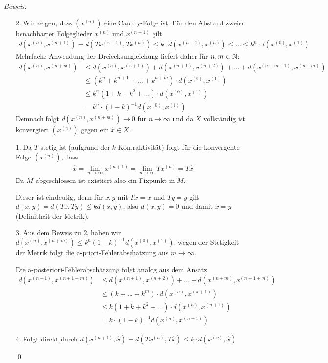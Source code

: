 \textit{Beweis.} 
\begin{enumerate}
  \item[2.] 
  Wir zeigen, dass $(x^{(n)})$ eine Cauchy-Folge ist: Für den Abstand zweier benachbarter Folgeglieder $x^{(n)}$ 
  und $x^{(n+1)}$ gilt
  \begin{align*}
    d(x^{(n)},x^{(n+1)}) 
    = d(Tx^{(n-1)},Tx^{(n)}) 
    \leq k\cdot d(x^{(n-1)},x^{(n)}) 
    \leq 
    \dotsc 
    \leq k^n\cdot d(x^{(0)},x^{(1)})
  \end{align*}
  Mehrfache Anwendung der Dreiecksungleichung liefert daher für $n,m\in\mathbb N$:
  \begin{align*}
    d(x^{(n)},x^{(n+m)}) 
    &\leq d(x^{(n)},x^{(n+1)}) + d(x^{(n+1)},x^{(n+2)}) + \dotsc + d(x^{(n+m-1)}, x^{(n+m)}) \\
    & \leq (k^n + k^{n+1} + \dotsc + k^{n+m})\cdot d(x^{(0)},x^{(1)}) \\
    & \leq k^n(1+k+k^2+\dotsc)\cdot d(x^{(0)},x^{(1)}) \\
    & = k^n\cdot(1-k)^{-1}d(x^{(0)},x^{(1)})
  \end{align*}
  Demnach folgt $d(x^{(n)},x^{(n+m)})\rightarrow 0$ für $n\rightarrow \infty$ und da $X$ vollständig ist 
  konvergiert $(x^{(n)})$ gegen ein $\hat{x}\in X$.

  \item[1.] 
  Da $T$ stetig ist (aufgrund der $k$-Kontraktivität) folgt für die konvergente Folge $(x^{(n)})$, dass 
  \begin{align*}
    \hat{x} = \lim_{n\rightarrow\infty} x^{(n+1)} = \lim_{n\rightarrow\infty} Tx^{(n)} = T\hat{x}
  \end{align*}
  Da $M$ abgeschlossen ist existiert also ein Fixpunkt in $M$. 

  Dieser ist eindeutig, denn für $x,y$ mit $Tx=x$ und $Ty=y$ gilt $d(x,y)=d(Tx,Ty)\leq k d(x,y)$, also $d(x,y)=0$ und 
  damit $x=y$ (Definitheit der Metrik).

  \item[3.] 
  Aus dem Beweis zu 2. haben wir $d(x^{(n)},x^{(n+m)})\leq k^n(1-k)^{-1}d(x^{(0)},x^{(1)})$, wegen der Stetigkeit 
  der Metrik folgt die a-priori-Fehlerabschätzung aus $m\rightarrow\infty$. 

  Die a-posteriori-Fehlerabschätzung folgt analog aus dem Ansatz
  \begin{align*}
    d(x^{(n+1)},x^{(n+1+m)}) &\leq d(x^{(n+1)},x^{(n+2)}) + \dotsc + d(x^{(n+m)}, x^{(n+1+m)}) \\
    & \leq (k + \dotsc + k^{m})\cdot d(x^{(n)},x^{(n+1)}) \\
    & \leq k(1+k+k^2+\dotsc)\cdot d(x^{(n)},x^{(n+1)}) \\
    & = k\cdot(1-k)^{-1}d(x^{(n)},x^{(n+1)})
  \end{align*}
  \item[4.] 
  Folgt direkt durch $d(x^{(n+1)},\hat{x})=d(Tx^{(n)},T\hat{x})\leq k\cdot d(x^{(n)},\hat{x})$ 

  \qed
\end{enumerate}

